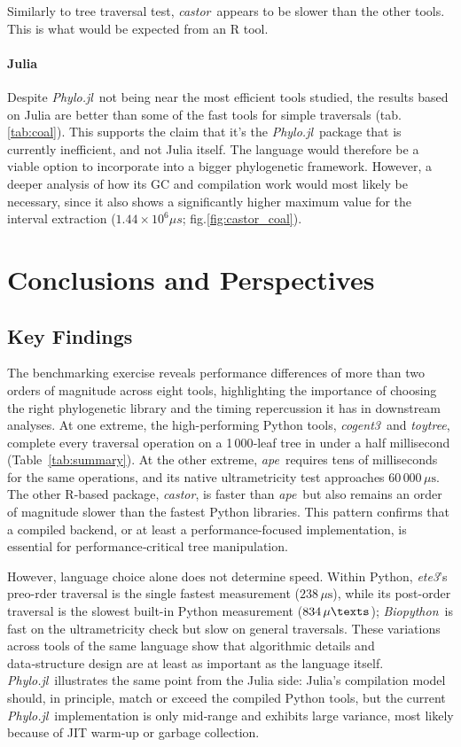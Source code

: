 \documentclass[11pt, a4paper]{article}
\newcommand{\ape}{\textit{ape}}
\newcommand{\cogent}{\textit{cogent3}}
\newcommand{\biopython}{\textit{Biopython}}
\newcommand{\ete}{\textit{ete3}}
\newcommand{\toytree}{\textit{toytree}}
\newcommand{\phylo}{\textit{Phylo.jl}}
\newcommand{\castor}{\textit{castor}}
\begin{document}
Similarly to tree traversal test, \castor\ appears to be slower than the other tools. This is what would be expected from an R tool. 

\paragraph{Julia}

Despite \phylo\ not being near the most efficient tools studied, the results based on Julia are better than some of the fast tools for simple traversals (tab.\ref{tab:coal}). This supports the claim that it's the \phylo\ package that is currently inefficient, and not Julia itself. The language would therefore be a viable option to  incorporate into a bigger phylogenetic framework. However, a deeper analysis of how its GC and compilation work would most likely be necessary, since it also shows a significantly higher maximum value for the interval extraction ($1.44 \times10^6 \mu s$; fig.\ref{fig:castor_coal}).

\section{Conclusions and Perspectives}

\subsection{Key Findings}

The benchmarking exercise reveals performance differences of more than two orders of magnitude across eight tools, highlighting the importance of choosing the right phylogenetic library and the timing repercussion it has in downstream analyses. At one extreme, the high-performing Python tools, \cogent\ and \toytree, complete every traversal operation on a 1\,000‑leaf tree in under a half millisecond (Table~\ref{tab:summary}).  At the other extreme, \ape\ requires tens of milliseconds for the same operations, and its native
ultrametricity test approaches $60\,000\,\mu\text{s}$. The other R-based package, \castor, is faster than \ape\ but also remains an order of magnitude slower than the fastest Python libraries. This pattern confirms that a compiled backend, or at least a performance-focused implementation, is essential for performance‑critical tree manipulation.

However, language choice alone does not determine speed.  Within Python, \ete's preo-rder traversal is the single fastest measurement ($238\,\mu\text{s}$), while its post-order traversal is the slowest built-in Python measurement ($834\,\mu\texts$); \biopython\ is fast on the ultrametricity check but slow on general traversals. These variations across tools of the same language show that algorithmic details and data‑structure design are at least as important as the language itself.  \phylo\ illustrates the same point from the Julia side: Julia's
compilation model should, in principle, match or exceed the compiled Python tools, but the current \phylo\ implementation is only mid‑range and exhibits large variance, most likely because of JIT warm‑up or garbage collection.
\end{document}
